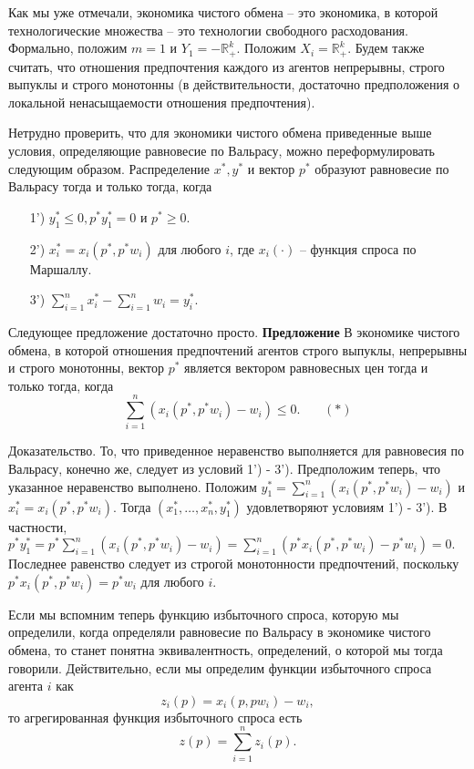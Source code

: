Как мы уже отмечали, экономика чистого обмена -- это экономика, в которой технологические множества
-- это технологии свободного расходования. Формально, положим $m=1$ и $Y_1=-\mathbb{R}^k_+$. Положим
$X_i=\mathbb{R}^k_+$. Будем также считать, что отношения предпочтения каждого из агентов непрерывны,
строго выпуклы и строго монотонны (в действительности, достаточно предположения о локальной
ненасыщаемости отношения предпочтения).

Нетрудно проверить, что для экономики чистого обмена приведенные выше условия,
определяющие равновесие по Вальрасу,
можно переформулировать следующим образом.
Распределение $x^*,y^*$  и вектор $p^*$ образуют равновесие по Вальрасу тогда и только тогда, когда
\begin{itemize}
\item[1')] $y^*_1\leq0, p^*y^*_1=0$ и $p^*\geq0.$
\item[2')] $x^*_i=x_i(p^*,p^*w_i)$ для любого $i$, где $x_i(\cdot)$ -- функция спроса по Маршаллу.
\item[3')] $\sum^n_{i=1}x^*_i-\sum^n_{i=1}w_i=y^*_i.$
\end{itemize}

Следующее предложение достаточно просто.
\textbf{Предложение} В
экономике чистого обмена, в которой отношения предпочтений агентов
строго выпуклы, непрерывны и строго монотонны, вектор $p^*$
является вектором равновесных цен тогда и только тогда, когда
$$\sum^n_{i=1}(x_i(p^*,p^*w_i)-w_i)\leq0.\,\,\,\,\,\,\,\,\,\,\,(*)$$

Доказательство. То, что приведенное неравенство выполняется для равновесия по Вальрасу,
конечно же, следует из условий 1') - 3'). Предположим теперь, что указанное неравенство
выполнено. Положим $y^*_1=\sum^n_{i=1}(x_i(p^*,p^*w_i)-w_i)$ и $x^*_i=x_i(p^*,p^*w_i).$
Тогда $(x^*_1,\ldots,x^*_n,y^*_1)$ удовлетворяют условиям 1') - 3'). В частности,
$p^*y^*_1=p^*\sum^n_{i=1}(x_i(p^*,p^*w_i)-w_i)=\sum^n_{i=1}(p^*x_i(p^*,p^*w_i)-p^*w_i)=0.$
Последнее равенство следует из строгой монотонности предпочтений, поскольку
$p^*x_i(p^*,p^*w_i)=p^*w_i$ для любого $i$.

Если мы вспомним теперь функцию избыточного спроса, которую мы определили, когда
определяли равновесие по Вальрасу в экономике чистого обмена, то станет понятна
эквивалентность, определений, о которой мы тогда говорили.
Действительно, если мы определим функции избыточного спроса агента $i$ как
$$z_i(p)=x_i(p,pw_i)-w_i,$$
то агрегированная функция избыточного спроса есть
$$z(p)=\sum^n_{i=1}z_i(p).$$

